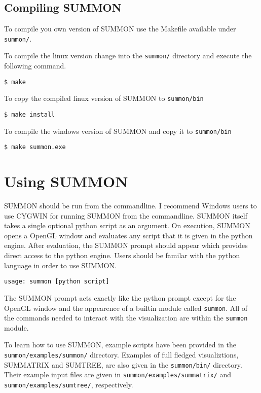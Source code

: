 \documentclass[12pt]{article}
\newcommand{\code}[1]{{\tt #1}}
\newcommand{\codeblock}[1]{\vspace{.1in} {\tt #1} \vspace{.1in}}
\begin{document}
\subsection{Compiling SUMMON}

To compile you own version of SUMMON use the Makefile available under 
\code{summon/}. 

To compile the linux version change into the \code{summon/} directory and
execute the following command.

\codeblock{\$ make}

To copy the compiled linux version of SUMMON to \code{summon/bin}

\codeblock{\$ make install}

To compile the windows version of SUMMON and copy it to \code{summon/bin}

\codeblock{\$ make summon.exe}



\section{Using SUMMON}
\label{sec:using}

SUMMON should be run from the commandline.  I recommend Windows users to use
CYGWIN for running SUMMON from the commandline.  SUMMON itself takes a single
optional python script as an argument.  On execution, SUMMON opens a OpenGL
window and evaluates any script that it is given in the python engine. After
evaluation, the SUMMON prompt should appear which provides direct access to the
python engine.  Users should be familar with the python language in order to use
SUMMON.

\codeblock{usage: summon [python script]}


The SUMMON prompt acts exactly like the python prompt except for the OpenGL
window and the appearence of a builtin module called \code{summon}.  All of the
commands needed to interact with the visualization are within the \code{summon} 
module.  

To learn how to use SUMMON, example scripts have been provided in the 
\code{summon/examples/summon/} directory.  Examples of full fledged
visualiztions, SUMMATRIX and SUMTREE, are also given in the \code{summon/bin/}
directory.  Their example input files are given in
\code{summon/examples/summatrix/} and \code{summon/examples/sumtree/},
respectively.
\end{document}
